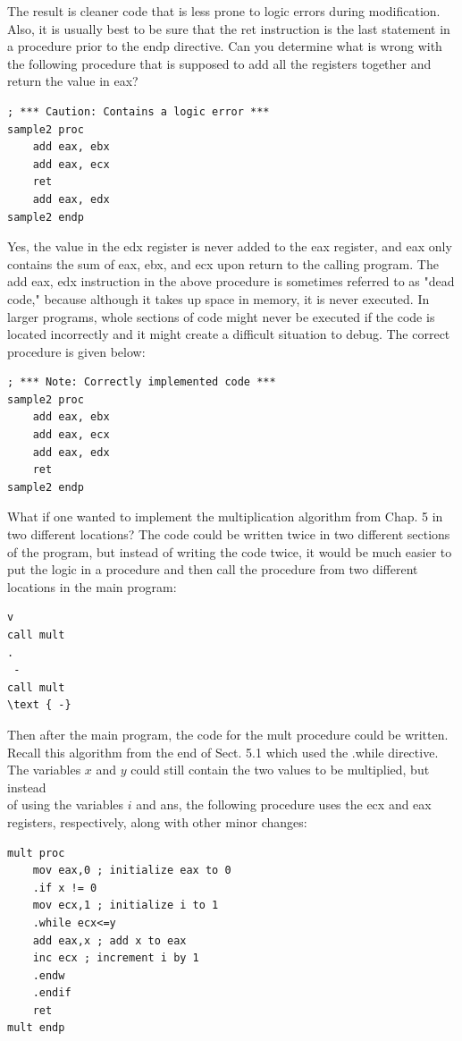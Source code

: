 \documentclass[10pt]{book}
\begin{document}
The result is cleaner code that is less prone to logic errors during modification. Also, it is usually best to be sure that the ret instruction is the last statement in a procedure prior to the endp directive. Can you determine what is wrong with the following procedure that is supposed to add all the registers together and return the value in eax?

\begin{verbatim}
; *** Caution: Contains a logic error ***
sample2 proc
    add eax, ebx
    add eax, ecx
    ret
    add eax, edx
sample2 endp
\end{verbatim}

Yes, the value in the edx register is never added to the eax register, and eax only contains the sum of eax, ebx, and ecx upon return to the calling program. The add eax, edx instruction in the above procedure is sometimes referred to as "dead code," because although it takes up space in memory, it is never executed. In larger programs, whole sections of code might never be executed if the code is located incorrectly and it might create a difficult situation to debug. The correct procedure is given below:

\begin{verbatim}
; *** Note: Correctly implemented code ***
sample2 proc
    add eax, ebx
    add eax, ecx
    add eax, edx
    ret
sample2 endp
\end{verbatim}

What if one wanted to implement the multiplication algorithm from Chap. 5 in two different locations? The code could be written twice in two different sections of the program, but instead of writing the code twice, it would be much easier to put the logic in a procedure and then call the procedure from two different locations in the main program:

\begin{verbatim}
v
call mult
.
 -
call mult
\text { -}
\end{verbatim}

Then after the main program, the code for the mult procedure could be written. Recall this algorithm from the end of Sect. 5.1 which used the .while directive. The variables $x$ and $y$ could still contain the two values to be multiplied, but instead\\
of using the variables $i$ and ans, the following procedure uses the ecx and eax registers, respectively, along with other minor changes:


\begin{verbatim}
mult proc
    mov eax,0 ; initialize eax to 0
    .if x != 0
    mov ecx,1 ; initialize i to 1
    .while ecx<=y
    add eax,x ; add x to eax
    inc ecx ; increment i by 1
    .endw
    .endif
    ret
mult endp
\end{verbatim}
\end{document}
